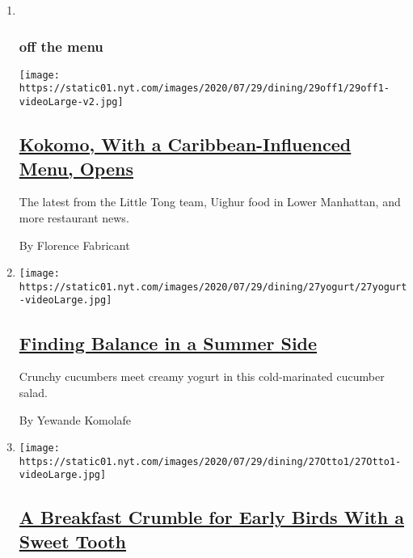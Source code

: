 \begin{enumerate}
\def\labelenumi{\arabic{enumi}.}
\item ~
  \hypertarget{off-the-menu}{%
  \subsubsection{off the menu}\label{off-the-menu}}

  \texttt{[image: https://static01.nyt.com/images/2020/07/29/dining/29off1/29off1-videoLarge-v2.jpg]}

  \hypertarget{kokomo-with-a-caribbean-influenced-menu-opens}{%
  \subsection{\texorpdfstring{\href{/2020/07/28/dining/nyc-restaurant-news.html}{Kokomo,
  With a Caribbean-Influenced Menu,
  Opens}}{Kokomo, With a Caribbean-Influenced Menu, Opens}}\label{kokomo-with-a-caribbean-influenced-menu-opens}}

  The latest from the Little Tong team, Uighur food in Lower Manhattan,
  and more restaurant news.

  By Florence Fabricant
\item
  \texttt{[image: https://static01.nyt.com/images/2020/07/29/dining/27yogurt/27yogurt-videoLarge.jpg]}

  \hypertarget{finding-balance-in-a-summer-side}{%
  \subsection{\texorpdfstring{\href{/2020/07/27/dining/cucumbers-yogurt-recipe.html}{Finding
  Balance in a Summer
  Side}}{Finding Balance in a Summer Side}}\label{finding-balance-in-a-summer-side}}

  Crunchy cucumbers meet creamy yogurt in this cold-marinated cucumber
  salad.

  By Yewande Komolafe
\item
  \texttt{[image: https://static01.nyt.com/images/2020/07/29/dining/27Otto1/27Otto1-videoLarge.jpg]}

  \hypertarget{a-breakfast-crumble-for-early-birds-with-a-sweet-tooth}{%
  \subsection{\texorpdfstring{\href{/2020/07/27/dining/breakfast-crumble-recipe.html}{A
  Breakfast Crumble for Early Birds With a Sweet
  Tooth}}{A Breakfast Crumble for Early Birds With a Sweet Tooth}}\label{a-breakfast-crumble-for-early-birds-with-a-sweet-tooth}}


\end{enumerate}
